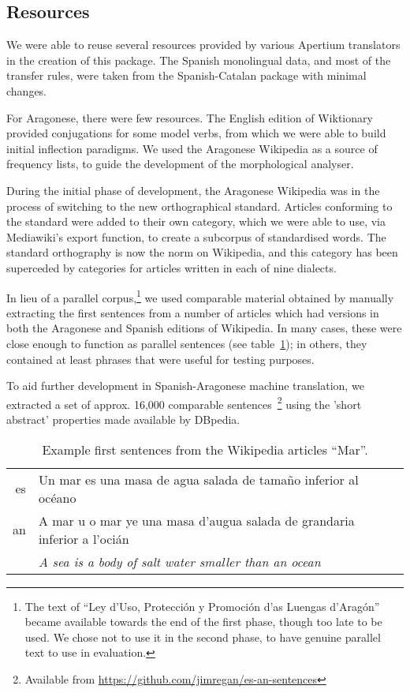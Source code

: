 \documentclass[10pt, a4paper]{article}
\begin{document}
  \subsection{Resources}
  
  We were able to reuse several resources provided by various Apertium translators in the creation of this package. The Spanish monolingual data, and most of the transfer rules, were taken from the Spanish-Catalan package with minimal changes. 
  
  For Aragonese, there were few resources. The English edition of Wiktionary provided conjugations for some model verbs, from which we were able to build initial inflection paradigms. We used the Aragonese Wikipedia as a source of frequency lists, to guide the development of the morphological analyser.
  
  During the initial phase of development, the Aragonese Wikipedia was in the process of switching to the new orthographical standard. Articles conforming to the standard were added to their own category, which we were able to use, via Mediawiki's export function, to create a subcorpus of standardised words. The standard orthography is now the norm on Wikipedia, and this category has been superceded by categories for articles written in each of nine dialects.
  
  In lieu of a parallel corpus,\footnote{The text of ``Ley d'Uso, Protección y Promoción d'as Luengas d'Aragón'' became available towards the end of the first phase, though too late to be used. We chose not to use it in the second phase, to have genuine parallel text to use in evaluation.} we used comparable material obtained by manually extracting the first sentences from a number of articles which had versions in both the Aragonese and Spanish editions of Wikipedia. In many cases, these were close enough to function as parallel sentences (see table~\ref{tab:comp}); in others, they contained at least phrases that were useful for testing purposes.
 
  To aid further development in Spanish-Aragonese machine translation, we extracted a set of approx. 16,000 comparable sentences~\footnote{Available from \url{https://github.com/jimregan/es-an-sentences}} using the 'short abstract' properties made available by DBpedia\cite{DBpedia}.


  \begin{table}
  \begin{center}
  \caption{Example first sentences from the Wikipedia articles ``Mar''.\label{tab:comp}}
  \begin{tabular}{r p{5cm}}
     es & Un mar es una masa de agua salada de tamaño inferior al océano \\
     an & A mar u o mar ye una masa d'augua salada de grandaria inferior a l'ocián \\
        & {\em A sea is a body of salt water smaller than an ocean}\\
  \end{tabular}
  \end{center}
  \end{table}
  
\end{document}
